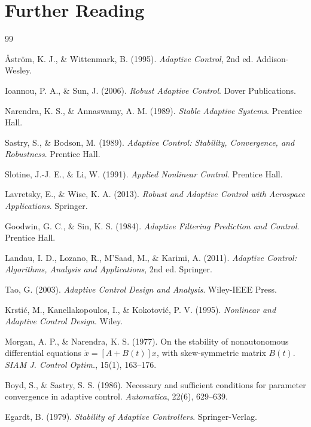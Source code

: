 \documentclass[a4paper, 11pt]{article}
\begin{document}
\section*{Further Reading}

\begin{thebibliography}{99}

{\AA}str{\"o}m, K. J., \& Wittenmark, B. (1995). \textit{Adaptive Control}, 2nd ed. Addison-Wesley.

Ioannou, P. A., \& Sun, J. (2006). \textit{Robust Adaptive Control}. Dover Publications.

Narendra, K. S., \& Annaswamy, A. M. (1989). \textit{Stable Adaptive Systems}. Prentice Hall.

Sastry, S., \& Bodson, M. (1989). \textit{Adaptive Control: Stability, Convergence, and Robustness}. Prentice Hall.

Slotine, J.-J. E., \& Li, W. (1991). \textit{Applied Nonlinear Control}. Prentice Hall.

Lavretsky, E., \& Wise, K. A. (2013). \textit{Robust and Adaptive Control with Aerospace Applications}. Springer.

Goodwin, G. C., \& Sin, K. S. (1984). \textit{Adaptive Filtering Prediction and Control}. Prentice Hall.

Landau, I. D., Lozano, R., M'Saad, M., \& Karimi, A. (2011). \textit{Adaptive Control: Algorithms, Analysis and Applications}, 2nd ed. Springer.

Tao, G. (2003). \textit{Adaptive Control Design and Analysis}. Wiley-IEEE Press.

Krsti{\'c}, M., Kanellakopoulos, I., \& Kokotovi{\'c}, P. V. (1995). \textit{Nonlinear and Adaptive Control Design}. Wiley.

Morgan, A. P., \& Narendra, K. S. (1977). On the stability of nonautonomous differential equations $\dot{x} = [A + B(t)]x$, with skew-symmetric matrix $B(t)$. \textit{SIAM J. Control Optim.}, 15(1), 163--176.

Boyd, S., \& Sastry, S. S. (1986). Necessary and sufficient conditions for parameter convergence in adaptive control. \textit{Automatica}, 22(6), 629--639.

Egardt, B. (1979). \textit{Stability of Adaptive Controllers}. Springer-Verlag.


\end{thebibliography}
\end{document}
